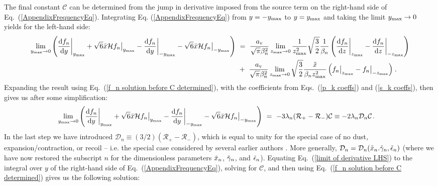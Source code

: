 \documentclass[fleqn,usenatbib]{mnras}
\begin{document}
The final constant $\mathcal{C}$ can be determined from the jump in derivative imposed from the source term on the right-hand side of Eq.~(\ref{AppendixFrequencyEq}). Integrating Eq.  (\ref{AppendixFrequencyEq}) from $y = -y_{\rm max}$ to $y= y_{\rm max}$ and taking the limit $y_{\rm max} \rightarrow 0$ yields for the left-hand side:
\begin{align}
    \lim_{y_{\rm max} \rightarrow 0} \left( \dfrac{\textrm{d}f_n}{\textrm{d}y}\bigg|_{y_{\rm max}} + \sqrt{6} \Bar{x}\mathcal{H} f_n \big|_{y_{\rm max}} - \dfrac{\textrm{d}f_n}{\textrm{d}y} \bigg|_{-y_{\rm max}} - \sqrt{6} \Bar{x}\mathcal{H} f_n \big|_{-y_{\rm max}} \right) ~&=~  \dfrac{a_{\rm v}}{\sqrt{\pi}\beta_n^2} \lim_{z_{\rm max} \rightarrow 0} \dfrac{1}{z_{\rm max}^2} \sqrt{\dfrac{3}{2}} \dfrac{1}{\beta_n}\left( \dfrac{\textrm{d}f_n}{\textrm{d}z}\bigg|_{z_{\rm max}} - \dfrac{\textrm{d}f_n}{\textrm{d}z} \bigg|_{-z_{\rm max}} \right) \nonumber \\ ~&+~  \dfrac{a_{\rm v}}{\sqrt{\pi}\beta_n^2} \lim_{z_{\rm max} \rightarrow 0} \sqrt{\dfrac{3}{2}}  \dfrac{\Tilde{x}}{\beta_n z_{\rm max}^2} \left( f_n\big|_{z_{\rm max}} - f_n\big|_{-z_{\rm max}} \right) \hspace{1 pt} .
\end{align}
Expanding the result using Eq.~(\ref{f_n solution before C determined}), with the coefficients from Eqs.~(\ref{p_k coeffs}) and (\ref{s_k coeffs}), then gives us after some simplification:
\begin{align}
    \lim_{y_{\rm max} \rightarrow 0} \left( \dfrac{\textrm{d}f_n}{\textrm{d}y}\bigg|_{y_{\rm max}} + \sqrt{6} \Bar{x}\mathcal{H} f_n \big|_{y_{\rm max}} - \dfrac{\textrm{d}f_n}{\textrm{d}y} \bigg|_{-y_{\rm max}} - \sqrt{6} \Bar{x}\mathcal{H} f_n \big|_{-y_{\rm max}} \right) ~&=~ - 3 \lambda_n (\mathcal{R}_+ - \mathcal{R}_-) \mathcal{C} \equiv -2 \lambda_n \mathcal{D}_n \mathcal{C}  \hspace{1 pt} \label{limit of derivative LHS}.
\end{align}
In the last step we have introduced $\mathcal{D}_n \equiv (3/2)(\mathcal{R}_+ - \mathcal{R}_-)$, which is equal to unity for the special case of no dust, expansion/contraction, or recoil -- i.e. the special case considered by several earlier authors \citep[e.g.][]{Dijkstra2006, Tasitsiomi2006, Lao2020, Tomaselli2021, McClellan2022}. More generally, $\mathcal{D}_n = \mathcal{D}_n(\Tilde{x}_n. \Tilde{\gamma}_n, \Tilde{\epsilon}_n)$ (where we have now restored the subscript $n$ for the dimensionless parameters $\Tilde{x}_n$, $\Tilde{\gamma}_n$, and $\Tilde{\epsilon}_n$). Equating Eq.~(\ref{limit of derivative LHS}) to the integral over $y$ of the right-hand side of Eq.~(\ref{AppendixFrequencyEq}), solving for $\mathcal{C}$, and then using Eq.~(\ref{f_n solution before C determined}) gives us the following solution:
\end{document}
